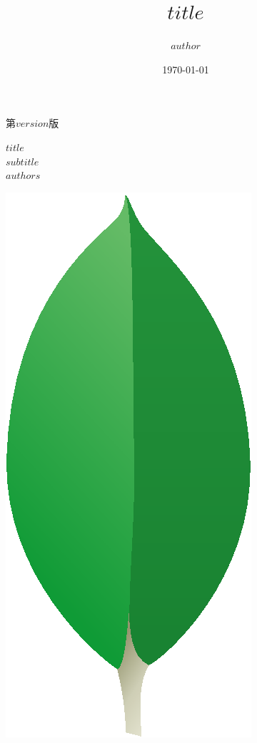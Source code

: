 \documentclass[oneside,12pt,uplatex]{jsbook}
\title{$title$}
\author{$author$}
\date{\today}
\begin{document}
\begin{titlepage}
\begin{flushright}
{\sf 第$version$版}
\end{flushright}
\vspace*{3em}
\begin{center}
{\HUGE\gtfamily\bfseries{$title$}}
\bigskip\\
{\LARGE\it{$subtitle$}}
\bigskip\\
{\LARGE\gtfamily\bfseries{$authors$}}

\vspace{8em}
\includegraphics{title.eps}
\end{center}

\end{titlepage}
\end{document}
